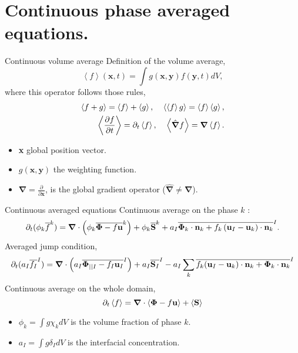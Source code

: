 \documentclass{sintefbeamer}
\newcommand{\nablab}{\bm{\nabla}}
\newcommand{\nablabh}{\hat{\bm{\nabla}}}
\begin{document}
\section{Continuous phase averaged equations.}
\begin{frame}{Continuous volume average}
Definition of the volume average, 
  \begin{equation}
    \left<f\right>(\textbf{x},t) = \int g(\textbf{x},\textbf{y}) f(\textbf{y},t)dV,
    \label{eq:avg}
\end{equation}
where this operator follows those rules,
\begin{align}
  \left<f+g\right> = \left<f\right>+\left<g\right>, \;\;\;\;
  \left<\left<f\right>g\right> = \left<f\right>\left<g\right>, \\
  \left<\frac{\partial f}{\partial t}\right> 
  = \pddt\left<f\right>, \;\;\;\;
  \left<\nablabh f\right> 
  = \nablab\left<f\right>. 
  \label{eq:avg_properties}
\end{align}
\begin{itemize}
  \item \textbf{x} global position vector. 
  \item $g(\textbf{x},\textbf{y})$ the weighting function. 
  \item $\nablab = \frac{\partial}{\partial \textbf{x}}$, is the global gradient operator ($\nablabh \neq \nablab$).
\end{itemize}
\end{frame}

\begin{frame}{Continuous averaged equations}
  Continuous average on the phase $k$ : 
  \begin{equation*}
    \pddt (\phi_k\kavg{f})
    = \nablab \cdot \left(
        \phi_k \kavg{\bm{\Phi} - f \textbf{u}}
    \right)
    + \phi_k \kavg{\textbf{S}}
    + a_I \Iavg{
        \bm{\Phi}_k \cdot \textbf{n}_k
        + f_k 
        \left(
            \textbf{u}_I
            - \textbf{u}_k
        \right) \cdot \textbf{n}_k
    }.
    \label{eq:avg_k_global}
\end{equation*}
Averaged jump condition, 
\begin{equation}
  \pddt (a_I\Iavg{f_I})  
  = 
  \nablab \cdot \left(a_I \Iavg{\mathbf{\Phi}_{||I} - f_I \textbf{u}_I}\right)
  +a_I\Iavg{\textbf{S}_I} 
  - a_I \sum_k \Iavg{
  f_k (\textbf{u}_I - \textbf{u}_k)\cdot \textbf{n}_k
  + \mathbf{\Phi}_k\cdot \textbf{n}_k
  }
  \label{eq:avg_general_jump}
\end{equation}
Continuous average on the whole domain, 
\begin{equation*}
  \pddt \avg{f}
  = \nablab \cdot \avg{\bm{\Phi} - f \textbf{u}}
  + \avg{\textbf{S}}
  \label{eq:avg_global}
\end{equation*}
\begin{itemize}
  \item $\phi_k = \int g \chi_k dV$ is the volume fraction of phase $k$. 
  \item $a_I = \int g \delta_I dV$ is the interfacial concentration. 
\end{itemize}
\end{frame}
\end{document}

